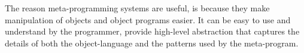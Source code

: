 The reason meta-programming systems are useful, is because they make manipulation of objects and object programs easier. It can be easy to use and understand by the programmer, provide high-level abstraction that captures the details of both the object-language and the patterns used by the meta-program\cite{sheard2001accomplishments}.




